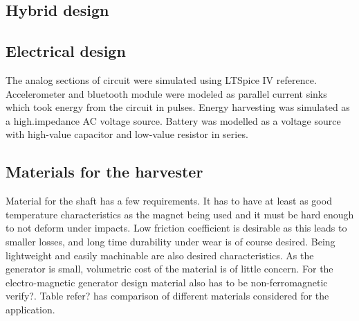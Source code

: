 \subsection{Hybrid design}

\subsection{Electrical design}
The analog sections of circuit were simulated using LTSpice IV {\color{red} reference}. Accelerometer and bluetooth module were modeled as parallel current sinks which took energy from the circuit in pulses. Energy harvesting was simulated as a high.impedance AC voltage source. 
Battery was modelled as a voltage source with high-value capacitor and low-value resistor in series.

\subsection{Materials for the harvester}
Material for the shaft has a few requirements. It has to have at least as good temperature characteristics as the magnet being used and it must be hard enough to not deform under impacts. Low friction coefficient is desirable as this leads to smaller losses, and long time durability under wear is of course desired. Being lightweight and easily machinable are also desired characteristics. As the generator is small, volumetric cost of the material is of little concern. For the electro-magnetic generator design material also has to be non-ferromagnetic {\color{red} verify?}. Table {\color{yellow} refer?} has comparison of different materials considered for the application.

\begin{table}[htb]
\caption{\label{parameters_of_materials} Materials for the shaft of generator}
\begin{center}
\end{center}
\end{table}


